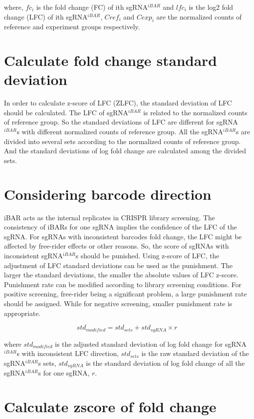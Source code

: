 \documentclass[11pt, a4paper]{article}
\begin{document}
where, $fc_{i}$ is the fold change (FC) of ith sgRNA$^{iBAR}$ and
$lfc_{i}$ is the log2 fold change (LFC) of ith sgRNA$^{iBAR}$,
$Cref_{i}$ and $Cexp_{i}$ are the normalized counts of reference
and experiment groups respectively.

\section{Calculate fold change standard deviation}

In order to calculate z-score of LFC (ZLFC), the standard deviation of
LFC should be calculated. The LFC of sgRNA$^{iBAR}$ is related to the
normalized counts of reference group. So the standard deviations of
LFC are different for sgRNA$^{iBAR}$s with different normalized counts
of reference group. All the sgRNA$^{iBAR}$s are divided into several
sets according to the normalized counts of reference group. And the
standard deviations of log fold change are calculated among the
divided sets.

\section{Considering barcode direction}


iBAR\citep{zhu_guide_2019} acts as the internal replicates in
CRISPR library screening. The consistency of iBARs for one sgRNA
implies the confidence of the LFC of the sgRNA. For sgRNAs with
inconsistent barcodes fold change, the LFC might be affected by
free-rider effects or other reasons. So, the score of sgRNAs with
inconsistent sgRNA$^{iBAR}$s should be punished. Using z-score of LFC,
the adjustment of LFC standard deviations can be used as the
punishment. The larger the standard deviations, the smaller the
absolute values of LFC z-score. Punishment rate can be modified
according to library screening conditions. For positive screening,
free-rider being a significant problem, a large punishment rate should
be assigned. While for negative screening, smaller punishment rate is
appropriate.

$$std_{modified} = std_{sets} + std_{sgRNA} \times r$$

where $std_{modified}$ is the adjusted standard deviation of log
fold change for sgRNA$^{iBAR}$s with inconsistent LFC direction,
$std_{sets}$ is the raw standard deviation of the
sgRNA$^{iBAR}$s sets, $std_{sgRNA}$ is the standard deviation of log fold
change of all the sgRNA$^{iBAR}$s for one sgRNA, $r$.

\section{Calculate zscore of fold change}
\end{document}
